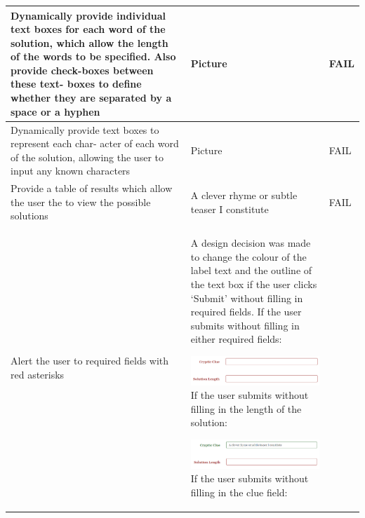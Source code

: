 \begin{landscape}
\begin{longtable}{|L{5cm}|L{15cm}|C{2cm}|}
Dynamically provide individual text boxes for each word
of the solution, which allow the length of the words to be
specified. Also provide check-boxes between these text-
boxes to define whether they are separated by a space
or a hyphen
    & Picture & FAIL \\ \hline
Dynamically provide text boxes to represent each char-
acter of each word of the solution, allowing the user to
input any known characters
    & Picture & FAIL \\ \hline
Provide a table of results which allow the user the to
view the possible solutions
    & A clever rhyme or subtle teaser I constitute & FAIL \\ \hline
Alert the user to required fields with red asterisks
    & A design decision was made to change the colour of the label text 
and the outline of the text box if the user clicks `Submit' without filling in
 required fields.
If the user submits without filling in either required fields:

\includegraphics[keepaspectratio=true]{evidence/alert1.png}
If the user submits without filling in the length of the solution: 

\includegraphics[keepaspectratio=true]{evidence/alert2.png}
If the user submits without filling in the clue field:


\end{longtable}
\end{landscape}
